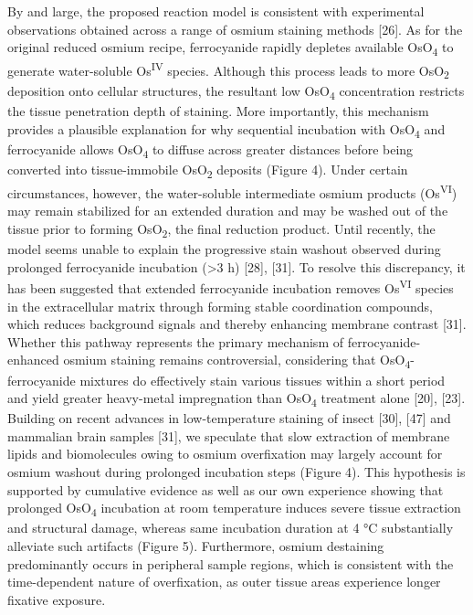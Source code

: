 \documentclass{article}
\begin{document}

By and large, the proposed reaction model is consistent with experimental observations obtained across a range of osmium staining methods [26]. As for the original reduced osmium recipe, ferrocyanide rapidly depletes available OsO\textsubscript{4} to generate water-soluble Os\textsuperscript{IV} species. Although this process leads to more OsO\textsubscript{2} deposition onto cellular structures, the resultant low OsO\textsubscript{4} concentration restricts the tissue penetration depth of staining. More importantly, this mechanism provides a plausible explanation for why sequential incubation with OsO\textsubscript{4} and ferrocyanide allows OsO\textsubscript{4} to diffuse across greater distances before being converted into tissue-immobile OsO\textsubscript{2} deposits (Figure 4). Under certain circumstances, however, the water-soluble intermediate osmium products (Os\textsuperscript{VI}) may remain stabilized for an extended duration and may be washed out of the tissue prior to forming OsO\textsubscript{2}, the final reduction product. Until recently, the model seems unable to explain the progressive stain washout observed during prolonged ferrocyanide incubation (>3 h) [28], [31]. To resolve this discrepancy, it has been suggested that extended ferrocyanide incubation removes Os\textsuperscript{VI} species in the extracellular matrix through forming stable coordination compounds, which reduces background signals and thereby enhancing membrane contrast [31]. Whether this pathway represents the primary mechanism of ferrocyanide-enhanced osmium staining remains controversial, considering that OsO\textsubscript{4}-ferrocyanide mixtures do effectively stain various tissues within a short period and yield greater heavy-metal impregnation than OsO\textsubscript{4} treatment alone [20], [23]. Building on recent advances in low-temperature staining of insect [30], [47] and mammalian brain samples [31], we speculate that slow extraction of membrane lipids and biomolecules owing to osmium overfixation may largely account for osmium washout during prolonged incubation steps (Figure 4). This hypothesis is supported by cumulative evidence as well as our own experience showing that prolonged OsO\textsubscript{4} incubation at room temperature induces severe tissue extraction and structural damage, whereas same incubation duration at 4 °C substantially alleviate such artifacts (Figure 5). Furthermore, osmium destaining predominantly occurs in peripheral sample regions, which is consistent with the time-dependent nature of overfixation, as outer tissue areas experience longer fixative exposure.
\end{document}

